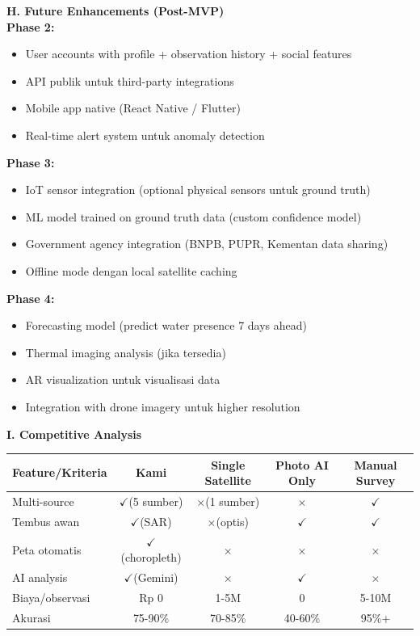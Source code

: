 \documentclass[12pt,a4paper]{article}
\newcommand{\subsectionbox}[1]{%
  \textbf{\large #1}\\[0.3cm]
}
\newcommand{\greencheck}{$\checkmark$}
\newcommand{\redcross}{$\times$}
\begin{document}
\vspace{0.5cm}

\subsectionbox{H. Future Enhancements (Post-MVP)}

\textbf{Phase 2:}
\begin{itemize}
  \item User accounts with profile + observation history + social features
  \item API publik untuk third-party integrations
  \item Mobile app native (React Native / Flutter)
  \item Real-time alert system untuk anomaly detection
\end{itemize}

\textbf{Phase 3:}
\begin{itemize}
  \item IoT sensor integration (optional physical sensors untuk ground truth)
  \item ML model trained on ground truth data (custom confidence model)
  \item Government agency integration (BNPB, PUPR, Kementan data sharing)
  \item Offline mode dengan local satellite caching
\end{itemize}

\textbf{Phase 4:}
\begin{itemize}
  \item Forecasting model (predict water presence 7 days ahead)
  \item Thermal imaging analysis (jika tersedia)
  \item AR visualization untuk visualisasi data
  \item Integration with drone imagery untuk higher resolution
\end{itemize}

\vspace{0.5cm}

\subsectionbox{I. Competitive Analysis}

\begin{center}
\small
\begin{tabularx}{\textwidth}{|l|c|c|c|c|}
  \hline
  \textbf{Feature/Kriteria} & \textbf{Kami} & \textbf{Single Satellite} & \textbf{Photo AI Only} & \textbf{Manual Survey} \\
  \hline
  Multi-source & \greencheck (5 sumber) & \redcross (1 sumber) & \redcross & \greencheck \\
  Tembus awan & \greencheck (SAR) & \redcross (optis) & \greencheck & \greencheck \\
  Peta otomatis & \greencheck (choropleth) & \redcross & \redcross & \redcross \\
  AI analysis & \greencheck (Gemini) & \redcross & \greencheck & \redcross \\
  Biaya/observasi & Rp 0 & 1-5M & 0 & 5-10M \\
  Akurasi & 75-90\% & 70-85\% & 40-60\% & 95\%+ \\
  \hline
\end{tabularx}
\end{center}
\end{document}
